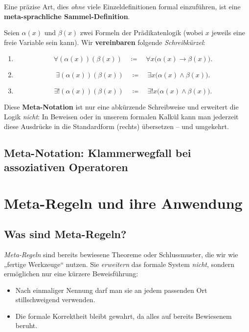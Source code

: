 \documentclass[main.tex]{subfiles}
\begin{document}
Eine präzise Art, dies \emph{ohne} viele Einzeldefinitionen formal einzuführen, ist eine \textbf{meta-sprachliche Sammel-Definition}. 

\begin{definition}
Seien $\alpha(x)$ und $\beta(x)$ zwei Formeln der Prädikatenlogik (wobei $x$ jeweils eine freie Variable sein kann). Wir \textbf{vereinbaren} folgende \emph{Schreibkürzel}:

\begin{enumerate}
  \item \[
    \forall(\alpha(x))(\beta(x))
    \quad\coloneqq\quad
    \forall x\bigl(\alpha(x)\to\beta(x)\bigr).
  \]
  \item \[
    \exists (\alpha(x))(\beta(x))
    \quad\coloneqq\quad
    \exists x\bigl(\alpha(x)\land\beta(x)\bigr).
  \]
    \item \[
    \exists! (\alpha(x))(\beta(x))
    \quad\coloneqq\quad
    \exists! x\bigl(\alpha(x)\land\beta(x)\bigr).
  \]
\end{enumerate}
%
Diese \textbf{Meta-Notation} ist nur eine abkürzende Schreibweise und erweitert die Logik \emph{nicht}: In Beweisen oder in unserem formalen Kalkül kann man jederzeit diese Ausdrücke in die Standardform (rechts) übersetzen – und umgekehrt.
\end{definition}

\subsection{Meta-Notation: Klammerwegfall bei assoziativen Operatoren}

\section{Meta-Regeln und ihre Anwendung}
\subsection{Was sind Meta-Regeln?}
\emph{Meta-Regeln} sind bereits bewiesene Theoreme oder Schlussmuster, die wir wie „fertige Werkzeuge“ nutzen. Sie \emph{erweitern} das formale System \emph{nicht}, sondern ermöglichen nur eine kürzere Beweisführung: 
\begin{itemize}
\item Nach einmaliger Nennung darf man sie an jedem passenden Ort stillschweigend verwenden.  
\item Die formale Korrektheit bleibt gewahrt, da alles auf bereits Bewiesenem beruht.
\end{itemize}
\end{document}
